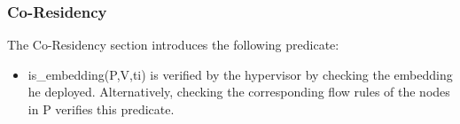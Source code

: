  
\subsubsection{Co-Residency}
The Co-Residency section introduces the following predicate:

\begin{itemize}
    \item is\_embedding(P,V,ti) is verified by the hypervisor by checking the embedding he deployed. Alternatively, checking the corresponding flow rules of the nodes in P verifies this predicate.
\end{itemize}